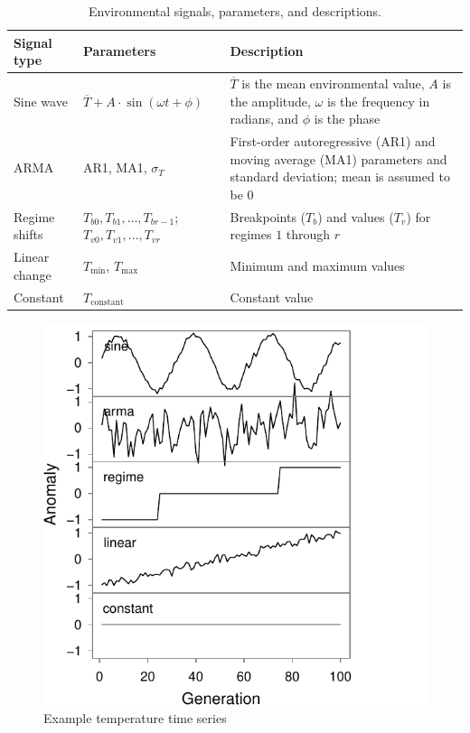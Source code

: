 \documentclass[12pt]{article}
\begin{document}
\begin{table}[h!]
\centering
\small
\caption{Environmental signals, parameters, and descriptions.}
\begin{tabular}{p{3.2cm}p{3.25cm}p{6.8cm}}
\toprule
Signal type & Parameters & Description \\
\midrule
Sine wave & $\overline{T} + A \cdot \sin(\omega t + \phi)$& $\overline{T}$ is 
the mean environmental value, $A$ is the amplitude, $\omega$ is the frequency in 
radians, and $\phi$ is the phase\\
ARMA & AR1, MA1, $\sigma_T$ & First-order autoregressive (AR1) and moving 
average (MA1) parameters and standard deviation; mean is assumed to be 0\\
Regime shifts & $T_{b0},T_{b1}, \ldots, T_{br-1}$; $T_{v0},T_{v1}, \ldots, T_{vr}$ 
& Breakpoints ($T_{b}$) and values ($T_v$) for regimes $1$ through $r$\\
Linear change & $T_{\mathrm{min}}$, $T_{\mathrm{max}}$ & Minimum and maximum 
values\\
Constant & $T_{\mathrm{constant}}$& Constant value\\
\bottomrule
\end{tabular}
\label{tab:env-types}
\end{table}

\begin{figure}[htbp]
\centering
\includegraphics{figure/env-ts.pdf}
\caption{Example temperature time series\label{fig:env-ts}}
\end{figure}
\end{document}
